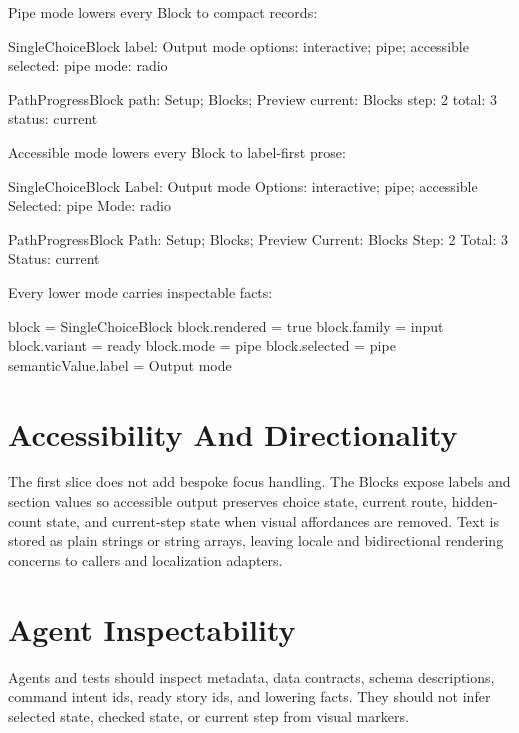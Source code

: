 Pipe mode lowers every Block to compact records:

\begin{CodeBlock}
SingleChoiceBlock
label: Output mode
options: interactive; pipe; accessible
selected: pipe
mode: radio
\end{CodeBlock}

\begin{CodeBlock}
PathProgressBlock
path: Setup; Blocks; Preview
current: Blocks
step: 2
total: 3
status: current
\end{CodeBlock}

Accessible mode lowers every Block to label-first prose:

\begin{CodeBlock}
SingleChoiceBlock
Label: Output mode
Options: interactive; pipe; accessible
Selected: pipe
Mode: radio
\end{CodeBlock}

\begin{CodeBlock}
PathProgressBlock
Path: Setup; Blocks; Preview
Current: Blocks
Step: 2
Total: 3
Status: current
\end{CodeBlock}

Every lower mode carries inspectable facts:

\begin{CodeBlock}
block = SingleChoiceBlock
block.rendered = true
block.family = input
block.variant = ready
block.mode = pipe
block.selected = pipe
semanticValue.label = Output mode
\end{CodeBlock}

\section{Accessibility And Directionality}\label{record-096-accessibility-and-directionality}

The first slice does not add bespoke focus handling. The Blocks expose labels and section values so accessible output preserves choice state, current route, hidden-count state, and current-step state when visual affordances are removed. Text is stored as plain strings or string arrays, leaving locale and bidirectional rendering concerns to callers and localization adapters.

\section{Agent Inspectability}\label{record-096-agent-inspectability}

Agents and tests should inspect metadata, data contracts, schema descriptions, command intent ids, ready story ids, and lowering facts. They should not infer selected state, checked state, or current step from visual markers.

